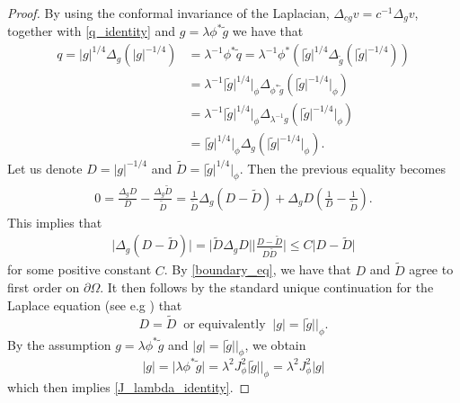 \documentclass[a4paper, 10pt, twoside, notitlepage]{amsart}
\theoremstyle{plain}
\numberwithin{equation}{section}
\newcommand {\p} {\partial}
\newcommand{\abs}[1]{\lvert #1 \rvert}
\begin{document}
\begin{proof}
	By using the conformal invariance of the Laplacian, $\Delta_{cg} v=c^{-1}\Delta_gv$,  together with \eqref{q_identity} and $g=\lambda\phi^*\tilde g$ we have that
	\begin{align*}
		q=\abs{g}^{1/4}\Delta_g(\abs{g}^{-1/4}) &=\lambda^{-1}\phi^*\tilde q = \lambda^{-1}\phi^*\left(\abs{\tilde g}^{1/4}\Delta_{\tilde g}(\abs{\tilde g}^{-1/4})\right)\\
        &=\lambda^{-1}\abs{\tilde g}^{1/4}|_{\phi}\Delta_{\phi^*\tilde g}(\abs{\tilde g}^{-1/4}|_{\phi})\\
		&= \lambda^{-1}\abs{\tilde g}^{1/4}|_{\phi}\Delta_{\lambda^{-1}g}(\abs{\tilde g}^{-1/4}|_{\phi})\\
		&= \abs{\tilde g}^{1/4}|_{\phi}\Delta_{g}(\abs{\tilde g}^{-1/4}|_{\phi}).
	\end{align*}
	Let us denote $D=\abs{g}^{-1/4}$ and $\tilde D=\abs{\tilde g}^{1/4}|_{\phi}$. Then the previous equality becomes
	\begin{align*}
		0=\frac{\Delta_gD}{D} - \frac{\Delta_g\tilde D}{\tilde D} = \frac{1}{\tilde D}\Delta_g(D-\tilde D) + \Delta_gD\left(\frac{1}{D} - \frac{1}{\tilde D}\right).
	\end{align*}
	This implies that
	\begin{align*}
		\abs{\Delta_g(D-\tilde D)}=\abs{\tilde D \Delta_gD}\abs{\frac{D-\tilde D}{D\tilde D}} \leq C \abs{D-\tilde D}
	\end{align*}
	for some positive constant $C$. By \eqref{boundary_eq}, we have that $D$ and $\tilde D$ agree to first order on $\p\Omega$. It then follows by the standard unique continuation for the Laplace equation (see e.g \cite[Theorem B.1.]{Kenig2011}) that
	\begin{equation*}
		D=\tilde D\ \text{ or equivalently } \ \abs{g}=\abs{\tilde g}|_{\phi}.
	\end{equation*}
	By the assumption $g=\lambda\phi^*\tilde g$ and $\abs{g}=\abs{\tilde g}|_{\phi}$, we obtain 
	\begin{equation*}
		\abs{g} = \abs{\lambda\phi^*\tilde g} = \lambda^2J_{\phi}^2\abs{\tilde g}|_{\phi} = \lambda^2J_{\phi}^2\abs{g}
	\end{equation*}
	which then implies \eqref{J_lambda_identity}.
\end{proof}
\end{document}
